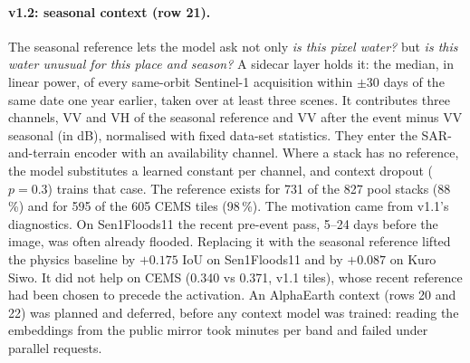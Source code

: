 \documentclass[10pt,twocolumn,a4paper]{article}
\newcommand{\pp}{\,\%}
\begin{document}
\paragraph{v1.2: seasonal context (row 21).} The seasonal reference lets the model ask not only \emph{is this pixel
water?} but \emph{is this water unusual for this place and season?} A sidecar layer holds it: the median, in linear power,
of every same-orbit Sentinel-1 acquisition within $\pm30$ days of the same date one year earlier, taken over at least
three scenes. It contributes three channels, VV and VH of the seasonal reference and VV after the event minus VV
seasonal (in dB), normalised with fixed data-set statistics. They enter the SAR-and-terrain encoder with an
availability channel. Where a stack has no reference, the model substitutes a learned constant per channel, and
context dropout ($p=0.3$) trains that case. The reference exists for 731 of the 827 pool stacks (88\pp{}) and for 595
of the 605 CEMS tiles (98\pp{}).
The motivation came from v1.1's diagnostics. On Sen1Floods11 the recent pre-event pass, 5--24 days before the image,
was often already flooded. Replacing it with the seasonal reference lifted the physics baseline by $+0.175$ IoU on
Sen1Floods11 and by $+0.087$ on Kuro Siwo. It did not help on CEMS (0.340 vs 0.371, v1.1 tiles), whose recent reference had been
chosen to precede the activation.
An AlphaEarth context (rows 20 and 22) was planned and deferred, before any context model was trained: reading the
embeddings from the public mirror took minutes per band and failed under parallel requests.
\end{document}
